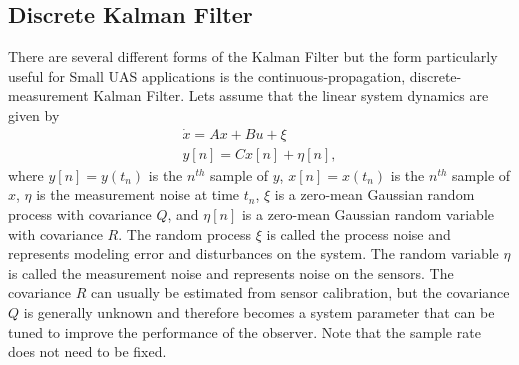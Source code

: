 \subsection{Discrete Kalman Filter}

There are several different forms of the Kalman Filter but the form particularly useful for Small UAS applications is the continuous-propagation, discrete-measurement Kalman Filter.
Lets assume that the linear system dynamics are given by
\begin{equation}\label{eq:linear_model}
\begin{aligned}
\dot{x}=Ax+Bu+\xi\\
y[n]=Cx[n]+\eta[n],
\end{aligned}
\end{equation}
where \begin{math} y[n] = y(t_n) \end{math} is the \begin{math} n^{th} \end{math} sample of \begin{math} y \end{math}, \begin{math} x[n] = x(t_n) \end{math} is the \begin{math} n^{th} \end{math} sample of \begin{math} x \end{math}, \begin{math} \eta \end{math} is the measurement noise at time \begin{math} t_n\end{math}, \begin{math} \xi \end{math} is a zero-mean Gaussian random process with covariance \begin{math} Q \end{math}, and \begin{math} \eta[n] \end{math} is a zero-mean Gaussian random variable with covariance \begin{math} R \end{math}. The random process \begin{math} \xi \end{math} is called the process noise and represents modeling error and disturbances on the system. The random variable \begin{math} \eta \end{math} is called the measurement noise and represents noise on the sensors. The covariance \begin{math} R \end{math} can usually be estimated from sensor calibration, but the covariance \begin{math} Q \end{math} is generally unknown and therefore becomes a system parameter that can be tuned to improve the performance of the observer. Note that the sample rate does not need to be fixed. \linebreak
